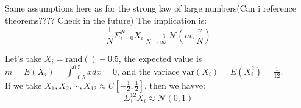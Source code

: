 {
    Same assumptions here as for the strong law of large numbers(Can i reference theorems???? Check in the future)
    The implication is:
    \begin{equation}
        \frac{1}{N}\Sigma^{N}_{i=0}X_i \underset{N\rightarrow \infty}{\rightarrow} \mathcal{N}(m,\frac{v}{N})
    \end{equation}
}
{
    Let's take $X_i = \text{rand}() - 0.5$, the expected value is  $m = E(X_i) = \int_{-0.5}^{0.5}xdx = 0$, and the variace $\text{var}(X_i) = E(X_i^{2}) = \frac{1}{12}$.\\
    If we take $X_1, X_2, \cdots , X_{12} \approx U[-\frac{1}{2},\frac{1}{2}]$, then we havve:
    \begin{equation}
        \Sigma_1^{12}X_i \approx \mathcal{N}(0,1)
    \end{equation}

}
